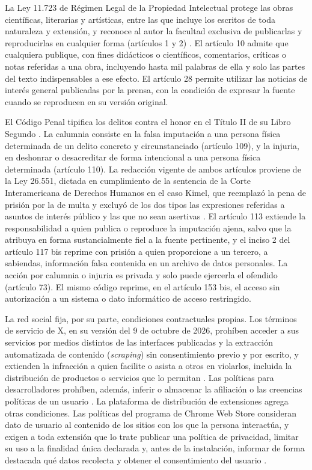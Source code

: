 La Ley 11.723 de Régimen Legal de la Propiedad Intelectual protege las obras científicas, literarias y artísticas, entre las que incluye los escritos de toda naturaleza y extensión, y reconoce al autor la facultad exclusiva de publicarlas y reproducirlas en cualquier forma (artículos 1 y 2) \parencite{CongresoNacion1933}. El artículo 10 admite que cualquiera publique, con fines didácticos o científicos, comentarios, críticas o notas referidas a una obra, incluyendo hasta mil palabras de ella y solo las partes del texto indispensables a ese efecto. El artículo 28 permite utilizar las noticias de interés general publicadas por la prensa, con la condición de expresar la fuente cuando se reproducen en su versión original.

El Código Penal tipifica los delitos contra el honor en el Título II de su Libro Segundo \parencite{CongresoNacion1984}. La calumnia consiste en la falsa imputación a una persona física determinada de un delito concreto y circunstanciado (artículo 109), y la injuria, en deshonrar o desacreditar de forma intencional a una persona física determinada (artículo 110). La redacción vigente de ambos artículos proviene de la Ley 26.551, dictada en cumplimiento de la sentencia de la Corte Interamericana de Derechos Humanos en el caso Kimel, que reemplazó la pena de prisión por la de multa y excluyó de los dos tipos las expresiones referidas a asuntos de interés público y las que no sean asertivas \parencite{CongresoNacion2009}. El artículo 113 extiende la responsabilidad a quien publica o reproduce la imputación ajena, salvo que la atribuya en forma sustancialmente fiel a la fuente pertinente, y el inciso 2 del artículo 117 bis reprime con prisión a quien proporcione a un tercero, a sabiendas, información falsa contenida en un archivo de datos personales. La acción por calumnia o injuria es privada y solo puede ejercerla el ofendido (artículo 73). El mismo código reprime, en el artículo 153 bis, el acceso sin autorización a un sistema o dato informático de acceso restringido.

La red social fija, por su parte, condiciones contractuales propias. Los términos de servicio de X, en su versión del 9 de octubre de 2026, prohíben acceder a sus servicios por medios distintos de las interfaces publicadas y la extracción automatizada de contenido (\textit{scraping}) sin consentimiento previo y por escrito, y extienden la infracción a quien facilite o asista a otros en violarlos, incluida la distribución de productos o servicios que lo permitan \parencite{XCorp2026}. Las políticas para desarrolladores prohíben, además, inferir o almacenar la afiliación o las creencias políticas de un usuario \parencite{XCorpDesarrolladores2026}. La plataforma de distribución de extensiones agrega otras condiciones. Las políticas del programa de Chrome Web Store consideran dato de usuario al contenido de los sitios con los que la persona interactúa, y exigen a toda extensión que lo trate publicar una política de privacidad, limitar su uso a la finalidad única declarada y, antes de la instalación, informar de forma destacada qué datos recolecta y obtener el consentimiento del usuario \parencite{Google2026}.

